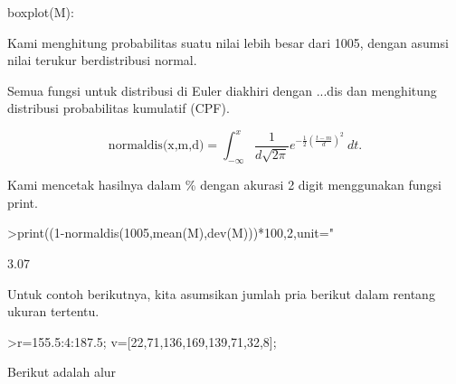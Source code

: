 \documentclass[a4paper,10pt]{article}
\begin{document}
\begin{eulernotebook}
\begin{eulercomment}
\begin{eulercomment}
\begin{eulercomment}
\begin{eulercomment}
\begin{eulercomment}
\begin{eulercomment}
\begin{eulercomment}
\begin{eulercomment}
\begin{eulercomment}
\begin{eulercomment}
\begin{eulercomment}
\begin{eulercomment}
\begin{eulercomment}
\begin{eulercomment}
\begin{eulercomment}
\begin{eulercomment}
\begin{eulercomment}
\begin{eulercomment}
\begin{eulercomment}
\begin{eulercomment}
\begin{eulercomment}
\begin{eulercomment}
\begin{eulercomment}
\begin{eulercomment}
\begin{eulercomment}
\begin{eulercomment}
\begin{eulercomment}
\begin{eulercomment}
\begin{eulercomment}
\begin{eulercomment}
\begin{eulercomment}
\begin{eulercomment}
\begin{eulercomment}
\begin{eulercomment}
\begin{eulercomment}
\begin{eulercomment}
\begin{eulercomment}
\begin{eulercomment}
\begin{eulercomment}
\begin{eulercomment}
\begin{eulercomment}
\begin{eulercomment}
\begin{eulercomment}
\begin{eulercomment}
\begin{eulercomment}
\begin{eulercomment}
\begin{eulercomment}
\begin{eulercomment}
\begin{eulercomment}
\begin{eulercomment}
\begin{eulercomment}
\begin{eulercomment}
\begin{eulercomment}
\begin{eulercomment}
\begin{eulercomment}
\begin{eulercomment}
\begin{eulercomment}
\begin{eulercomment}
\begin{eulercomment}
\begin{eulercomment}
\begin{eulercomment}
\begin{eulercomment}
\begin{eulercomment}
\begin{eulercomment}
\begin{eulercomment}
\begin{eulercomment}
\begin{eulerprompt}
boxplot(M):
\end{eulerprompt}
\begin{eulercomment}
Kami menghitung probabilitas suatu nilai lebih besar dari 1005, dengan
asumsi nilai terukur berdistribusi normal.

Semua fungsi untuk distribusi di Euler diakhiri dengan ...dis dan
menghitung distribusi probabilitas kumulatif (CPF).

\end{eulercomment}
\begin{eulerformula}
\[
\text{normaldis(x,m,d)}=\int_{-\infty}^x \frac{1}{d\sqrt{2\pi}}e^{-\frac{1}{2}(\frac{t-m}{d})^2}\ dt.
\]
\end{eulerformula}
\begin{eulercomment}
Kami mencetak hasilnya dalam \% dengan akurasi 2 digit menggunakan
fungsi print.
\end{eulercomment}
\begin{eulerprompt}
>print((1-normaldis(1005,mean(M),dev(M)))*100,2,unit=" %
\end{eulerprompt}
\begin{euleroutput}
        3.07 %
\end{euleroutput}
\begin{eulercomment}
Untuk contoh berikutnya, kita asumsikan jumlah pria berikut dalam
rentang ukuran tertentu.
\end{eulercomment}
\begin{eulerprompt}
>r=155.5:4:187.5; v=[22,71,136,169,139,71,32,8];
\end{eulerprompt}
\begin{eulercomment}
Berikut adalah alur 
\end{eulercomment}
\end{eulercomment}
\end{eulercomment}
\end{eulercomment}
\end{eulercomment}
\end{eulercomment}
\end{eulercomment}
\end{eulercomment}
\end{eulercomment}
\end{eulercomment}
\end{eulercomment}
\end{eulercomment}
\end{eulercomment}
\end{eulercomment}
\end{eulercomment}
\end{eulercomment}
\end{eulercomment}
\end{eulercomment}
\end{eulercomment}
\end{eulercomment}
\end{eulercomment}
\end{eulercomment}
\end{eulercomment}
\end{eulercomment}
\end{eulercomment}
\end{eulercomment}
\end{eulercomment}
\end{eulercomment}
\end{eulercomment}
\end{eulercomment}
\end{eulercomment}
\end{eulercomment}
\end{eulercomment}
\end{eulercomment}
\end{eulercomment}
\end{eulercomment}
\end{eulercomment}
\end{eulercomment}
\end{eulercomment}
\end{eulercomment}
\end{eulercomment}
\end{eulercomment}
\end{eulercomment}
\end{eulercomment}
\end{eulercomment}
\end{eulercomment}
\end{eulercomment}
\end{eulercomment}
\end{eulercomment}
\end{eulercomment}
\end{eulercomment}
\end{eulercomment}
\end{eulercomment}
\end{eulercomment}
\end{eulercomment}
\end{eulercomment}
\end{eulercomment}
\end{eulercomment}
\end{eulercomment}
\end{eulercomment}
\end{eulercomment}
\end{eulercomment}
\end{eulercomment}
\end{eulercomment}
\end{eulercomment}
\end{eulercomment}
\end{eulercomment}
\end{eulernotebook}
\end{document}
